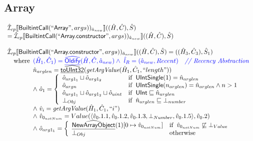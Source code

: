 \subsection{Array}
\[
\begin{array}{l}
\hat{\mathcal{I}} _{cp}\llbracket \mbox{\textsf{BuiltintCall}}(``\mbox{\textsf{Array}}",args))_{\hat{a}_{new}}\rrbracket((\hat{H},\hat{C}), \hat{S})\\
  = \hat{\mathcal{I}} _{cp}\llbracket \mbox{\textsf{BuiltintCall}}(``\mbox{\textsf{Array.constructor}}",args))_{\hat{a}_{new}}\rrbracket((\hat{H},\hat{C}), \hat{S})
\\\\

      
      
\hat{\mathcal{I}} _{cp}\llbracket \mbox{\textsf{BuiltintCall}}(``\mbox{\textsf{Array.constructor}}",args))_{\hat{a}_{new}}\rrbracket((\hat{H},\hat{C}), \hat{S})
  = ((\hat{H}_3, \hat{C}_3), \hat{S}_1)\\
\quad{\rm where}\begin{array}[t]{l}
  \color{blue} (\hat{H}_1, \hat{C}_1) = \widehat{\underline{\sf Oldify}}(\hat{H}, \hat{C}, \hat{a}_{new})
  \land\ \color{blue}\hat{l}_{R} = (\hat{a}_{new}, Recent)
    \quad\textit{{\color{blue}// Recency Abstraction}}\\
  \hat{n}_{arglen} = \widehat{\underline{\sf toUInt32}}(\emph{getArgValue}(\hat{H}_1, \hat{C}_1, ``length"))\\
  \land\ \hat{o}_1 = \left\{\begin{array}{ll}
      \hat{o}_{arg1_1} \sqcup \hat{o}_{arg1_2}
      & {\rm if}\begin{array}[t]{l}\mbox{\textsf{UIntSingle}}(1) = \hat{n}_{arglen}\end{array}\\
      \hat{o}_{argn}
      & {\rm if}\begin{array}[t]{l}\mbox{\textsf{UIntSingle}}(n_{arglen}) = \hat{n}_{arglen} \land n > 1\end{array}\\
      \hat{o}_{arg1_1} \sqcup \hat{o}_{arg1_2} \sqcup \hat{o}_{uint}
      & {\rm if}\begin{array}[t]{l}\mbox{\textsf{UInt}} \sqsubseteq \hat{n}_{arglen}\end{array}\\
      \bot_{Obj} & {\rm if}\begin{array}[t]{l}\hat{n}_{arglen} \sqsubseteq \bot_{number}\end{array}\\
    \end{array}\right.\\
  \land\ \hat{v}_i = \emph{getArgValue}(\hat{H}_1, \hat{C}_1, ``i")\\
  \land\ \hat{v}_{0_{notNum}} =
    Value(\langle \hat{v}_0.1.1,\hat{v}_0.1.2,\hat{v}_0.1.3,\bot_{Number},\hat{v}_0.1.5 \rangle, \hat{v}_0.2)\\
  \land\ \hat{o}_{arg1_1} = \left\{\begin{array}{ll}
      \widehat{\underline{\sf NewArrayObject}}(1)[0 \mapsto \hat{v}_{0_{notNum}}] 
      & {\rm if}\begin{array}[t]{l}\hat{v}_{0_{notNum}} \not\sqsubseteq \bot_{Value}\end{array}\\
      \bot_{Obj} & {\rm otherwise}
    \end{array}\right.\\
\end{array}
\end{array}\]
